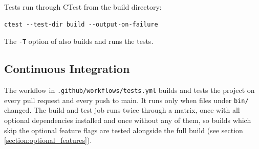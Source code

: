 Tests run through CTest from the build directory:
\begin{lstlisting}[style=terminalstyle]
ctest --test-dir build --output-on-failure
\end{lstlisting}
The \texttt{-T} option of  also builds and runs the tests.

\subsection{Continuous Integration}

The workflow in \texttt{.github/workflows/tests.yml} builds and tests the project on every pull request and every push to main. It runs only when files under \texttt{bin/} changed. The build-and-test job runs twice through a matrix, once with all optional dependencies installed and once without any of them, so builds which skip the optional feature flags are tested alongside the full build (see section \ref{section:optional_features}).

